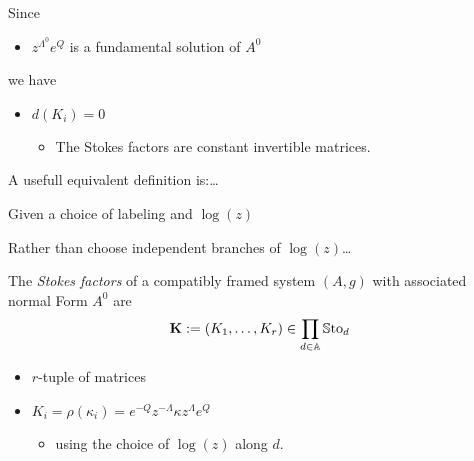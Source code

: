 \begin{paracol}{2}
\begin{defn}
\begin{itemize}
    \end{itemize}
  \end{defn}
  Since
  \begin{itemize}
    \item $z^{\Lambda^0}e^Q$ is a fundamental solution of $A^0$
  \end{itemize}
  we have
  \begin{itemize}
    \item $d(K_i)=0$
      \begin{itemize}
        \item The Stokes factors are constant invertible matrices.
      \end{itemize}
  \end{itemize}
  A usefull equivalent definition is:\dots
\end{paracol} %
\begin{defn}[1.27]
  Given a choice of labeling and $\log(z)$
  \begin{rem}
    Rather than choose independent branches of $\log(z)$\dots
  \end{rem}
  The \emph{Stokes factors} of a compatibly framed system $(A,g)$ with
  associated normal Form $A^0$ are
  \[
    \textbf{K}:=(K_1,\dots,K_r)\in\prod_{d\in\mathbb{A}}\operatorname{\mathbb{S}to}_d
  \]
  \begin{itemize}
    \item $r$-tuple of matrices
    \item $K_i=\rho(\kappa_i)=e^{-Q}z^{-\Lambda}\kappa z^\Lambda e^Q$
      \begin{itemize}
        \item using the choice of $\log(z)$ along $d$.
      \end{itemize}
  \end{itemize}
\end{defn}
